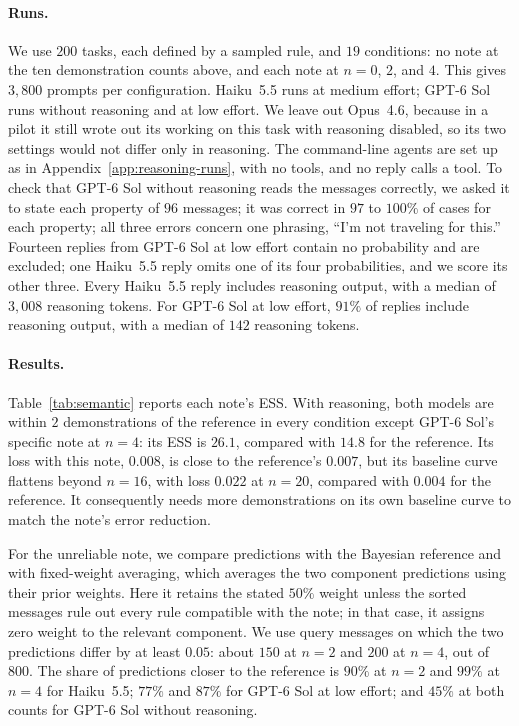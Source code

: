 \documentclass{article}
\theoremstyle{definition}
\begin{document}
\paragraph{Runs.}
We use $200$ tasks, each defined by a sampled rule, and $19$ conditions: no note at the ten demonstration counts above, and each note at $n=0$, $2$, and $4$. This gives $3{,}800$ prompts per configuration. Haiku~5.5 runs at medium effort; GPT-6 Sol runs without reasoning and at low effort. We leave out Opus~4.6, because in a pilot it still wrote out its working on this task with reasoning disabled, so its two settings would not differ only in reasoning. The command-line agents are set up as in Appendix~\ref{app:reasoning-runs}, with no tools, and no reply calls a tool. To check that GPT-6 Sol without reasoning reads the messages correctly, we asked it to state each property of $96$ messages; it was correct in $97$ to $100\%$ of cases for each property; all three errors concern one phrasing, ``I'm not traveling for this.'' Fourteen replies from GPT-6 Sol at low effort contain no probability and are excluded; one Haiku~5.5 reply omits one of its four probabilities, and we score its other three. Every Haiku~5.5 reply includes reasoning output, with a median of $3{,}008$ reasoning tokens. For GPT-6 Sol at low effort, $91\%$ of replies include reasoning output, with a median of $142$ reasoning tokens.

\paragraph{Results.}
Table~\ref{tab:semantic} reports each note's ESS. With reasoning, both models are within $2$ demonstrations of the reference in every condition except GPT-6 Sol's specific note at $n=4$: its ESS is $26.1$, compared with $14.8$ for the reference. Its loss with this note, $0.008$, is close to the reference's $0.007$, but its baseline curve flattens beyond $n=16$, with loss $0.022$ at $n=20$, compared with $0.004$ for the reference. It consequently needs more demonstrations on its own baseline curve to match the note's error reduction.

For the unreliable note, we compare predictions with the Bayesian reference and with fixed-weight averaging, which averages the two component predictions using their prior weights. Here it retains the stated $50\%$ weight unless the sorted messages rule out every rule compatible with the note; in that case, it assigns zero weight to the relevant component. We use query messages on which the two predictions differ by at least $0.05$: about $150$ at $n=2$ and $200$ at $n=4$, out of $800$. The share of predictions closer to the reference is $90\%$ at $n=2$ and $99\%$ at $n=4$ for Haiku~5.5; $77\%$ and $87\%$ for GPT-6 Sol at low effort; and $45\%$ at both counts for GPT-6 Sol without reasoning.
\end{document}
